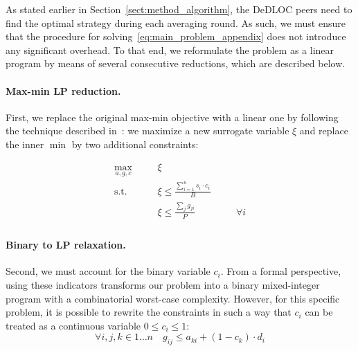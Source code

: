 As stated earlier in Section~\ref{sect:method_algorithm}, the DeDLOC peers need to find the optimal strategy during each averaging round. As such, we must ensure that the procedure for solving~\eqref{eq:main_problem_appendix} does not introduce any significant overhead. To that end, we reformulate the problem as a linear program by means of several consecutive reductions, which are described below.

\paragraph{Max-min LP reduction.} First, we replace the original max-min objective with a linear one by following the technique described in~\cite{kaplan1974application}: we maximize a new surrogate variable $\xi$ and replace the inner $\min$ by two additional constraints:

\begin{equation}
\label{eq:main_problem_appendix_minmax}
\begin{array}{rclll}
\underset{a, g, c}{\max} & & \xi &\quad&\\
\textrm{s.t. }  &\quad& \xi \leq \frac{\sum_{i=1}^n s_i \cdot c_i }{B} & & \\
                 &\quad & \xi \leq \frac{ \sum_{j} g_{j i}}{P}  &\quad&\forall i \\
\end{array}
\end{equation}


\paragraph{Binary to LP relaxation.} Second, we must account for the binary variable $c_i$. From a formal perspective, using these indicators transforms our problem into a binary mixed-integer program with a combinatorial worst-case complexity. However, for this specific problem, it is possible to rewrite the constraints in such a way that $c_i$ can be treated as a continuous variable $0\leq c_i\leq 1$:%
\begin{equation}
\label{eq:appendix_c_relax}
\forall i, j, k \in 1\dots n \quad g_{ij} \leq a_{ki} + (1 - c_k) \cdot d_i
\end{equation}

